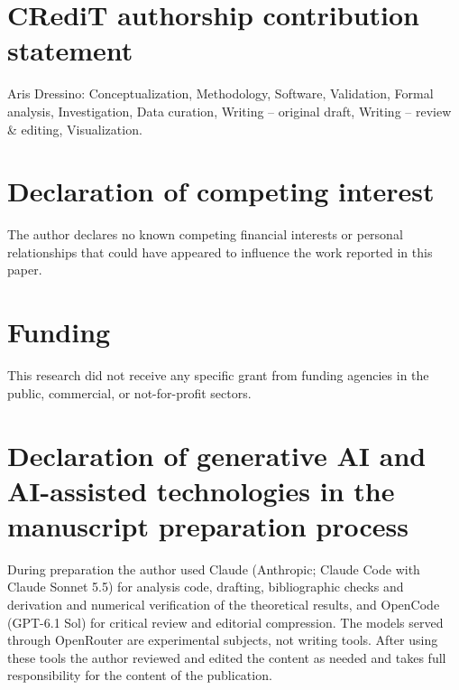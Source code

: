 \documentclass[preprint,11pt,number,sort&compress]{elsarticle}
\begin{document}
\section*{CRediT authorship contribution statement}
Aris Dressino: Conceptualization, Methodology, Software, Validation, Formal analysis,
Investigation, Data curation, Writing -- original draft, Writing -- review \& editing,
Visualization.

\section*{Declaration of competing interest}
The author declares no known competing financial interests or personal relationships
that could have appeared to influence the work reported in this paper.

\section*{Funding}
This research did not receive any specific grant from funding agencies in the public,
commercial, or not-for-profit sectors.

\section*{Declaration of generative AI and AI-assisted technologies in the manuscript preparation process}
During preparation the author used Claude (Anthropic; Claude Code with
Claude Sonnet 5.5) for analysis code, drafting, bibliographic checks and
derivation and numerical verification of the theoretical results, and
OpenCode (GPT-6.1 Sol) for critical review and editorial compression.
The models served through OpenRouter are experimental subjects, not writing tools.
After using these tools the author reviewed and edited the content as needed and takes
full responsibility for the content of the publication.



\end{document}
